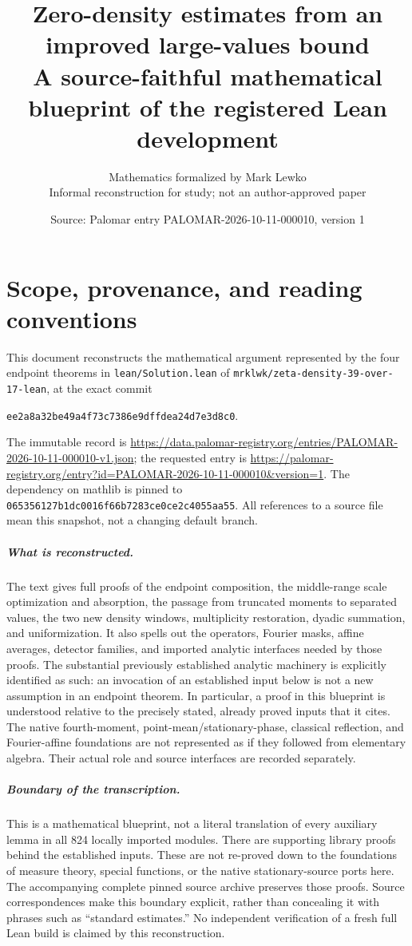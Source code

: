 \documentclass[11pt,a4paper,oneside]{book}
\title{Zero-density estimates from an improved large-values bound\\[6pt]\large A source-faithful mathematical blueprint of the registered Lean development}
\author{Mathematics formalized by Mark Lewko\\\normalsize Informal reconstruction for study; not an author-approved paper}
\date{Source: Palomar entry PALOMAR-2026-10-11-000010, version 1}
\theoremstyle{definition}
\newcommand{\lean}[1]{\nolinkurl{#1}}
\begin{document}
\pagestyle{plain}
\frontmatter
\hypersetup{pageanchor=false}
\maketitle
\hypersetup{pageanchor=true}
\chapter*{Scope, provenance, and reading conventions}
This document reconstructs the mathematical argument represented by the four
endpoint theorems in \lean{lean/Solution.lean} of
\lean{mrklwk/zeta-density-39-over-17-lean}, at the exact commit
\begin{center}\lean{ee2a8a32be49a4f73c7386e9dffdea24d7e3d8c0}.\end{center}
The immutable record is
\url{https://data.palomar-registry.org/entries/PALOMAR-2026-10-11-000010-v1.json};
the requested entry is
\url{https://palomar-registry.org/entry?id=PALOMAR-2026-10-11-000010&version=1}.
The dependency on mathlib is pinned to
\lean{065356127b1dc0016f66b7283ce0ce2c4055aa55}.
All references to a source file mean this snapshot, not a changing default branch.

\paragraph{What is reconstructed.}
The text gives full proofs of the endpoint composition, the middle-range scale
optimization and absorption, the passage from truncated moments to separated
values, the two new density windows, multiplicity restoration, dyadic summation,
and uniformization. It also spells out the operators, Fourier masks, affine
averages, detector families, and imported analytic interfaces needed by those
proofs. The substantial previously established analytic machinery is explicitly
identified as such: an invocation of an established input below is not a new
assumption in an endpoint theorem. In particular, a proof in this blueprint is
understood relative to the precisely stated, already proved inputs that it cites.
The native fourth-moment, point-mean/stationary-phase, classical reflection, and
Fourier-affine foundations are not represented as if they followed from elementary
algebra. Their actual role and source interfaces are recorded separately.

\paragraph{Boundary of the transcription.}
This is a mathematical blueprint, not a literal translation of every auxiliary
lemma in all 824 locally imported modules. There are supporting library proofs
behind the established inputs. These are not re-proved down to the foundations
of measure theory, special functions, or the native stationary-source ports here.
The accompanying complete pinned source archive preserves those proofs. Source
correspondences make this boundary explicit, rather than concealing it with
phrases such as ``standard estimates.'' No independent verification of a fresh
full Lean build is claimed by this reconstruction.
\end{document}
